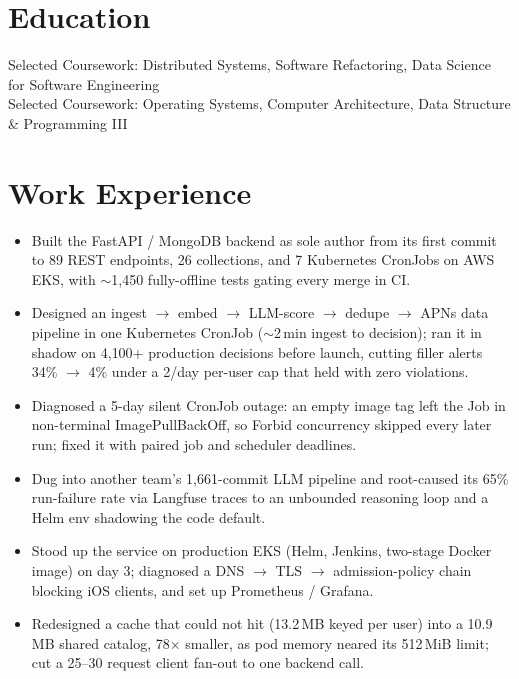 \documentclass[11pt, letterpaper]{article}
\begin{document}

\section{Education}
Selected Coursework: Distributed Systems, Software Refactoring, Data Science for Software Engineering\\[1pt]
Selected Coursework: Operating Systems, Computer Architecture, Data Structure \& Programming III

\section{Work Experience}
\begin{itemize}
  \item Built the FastAPI / MongoDB backend as sole author from its first commit to 89 REST endpoints, 26 collections, and 7 Kubernetes CronJobs on AWS EKS, with $\sim$1{,}450 fully-offline tests gating every merge in CI.
  \item Designed an ingest $\to$ embed $\to$ LLM-score $\to$ dedupe $\to$ APNs data pipeline in one Kubernetes CronJob ($\sim$2\,min ingest to decision); ran it in shadow on 4{,}100+ production decisions before launch, cutting filler alerts 34\% $\to$ 4\% under a 2/day per-user cap that held with zero violations.
  \item Diagnosed a 5-day silent CronJob outage: an empty image tag left the Job in non-terminal ImagePullBackOff, so Forbid concurrency skipped every later run; fixed it with paired job and scheduler deadlines.
  \item Dug into another team's 1{,}661-commit LLM pipeline and root-caused its 65\% run-failure rate via Langfuse traces to an unbounded reasoning loop and a Helm env shadowing the code default.
  \item Stood up the service on production EKS (Helm, Jenkins, two-stage Docker image) on day 3; diagnosed a DNS $\to$ TLS $\to$ admission-policy chain blocking iOS clients, and set up Prometheus / Grafana.
  \item Redesigned a cache that could not hit (13.2\,MB keyed per user) into a 10.9\,MB shared catalog, 78$\times$ smaller, as pod memory neared its 512\,MiB limit; cut a 25--30 request client fan-out to one backend call.
\end{itemize}
\end{document}
